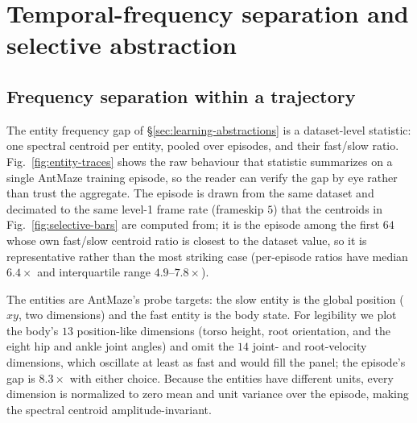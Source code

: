 \section{Temporal-frequency separation and selective abstraction}

\subsection{Frequency separation within a trajectory}
\label{app:entity-traces}

The entity frequency gap of \S\ref{sec:learning-abstractions} is a dataset-level statistic: one
spectral centroid per entity, pooled over episodes, and their fast/slow ratio.
Fig.~\ref{fig:entity-traces} shows the raw behaviour that statistic summarizes on a
single AntMaze training episode, so the reader can verify the gap by eye rather than
trust the aggregate. The episode is drawn from the same dataset and decimated to the
same level-1 frame rate (frameskip $5$) that the centroids in
Fig.~\ref{fig:selective-bars} are computed from; it is the episode among the first $64$
whose own fast/slow centroid ratio is closest to the dataset value, so it is
representative rather than the most striking case (per-episode ratios have median
$6.4\times$ and interquartile range $4.9$--$7.8\times$).

The entities are AntMaze's probe targets: the slow entity is the global position
($xy$, two dimensions) and the fast entity is the body state. For legibility we plot
the body's $13$ position-like dimensions (torso height, root orientation, and the
eight hip and ankle joint angles) and omit the $14$ joint- and root-velocity
dimensions, which oscillate at least as fast and would fill the panel; the episode's
gap is $8.3\times$ with either choice. Because the entities have different units, every
dimension is normalized to zero mean and unit variance over the episode,
making the spectral centroid amplitude-invariant.


